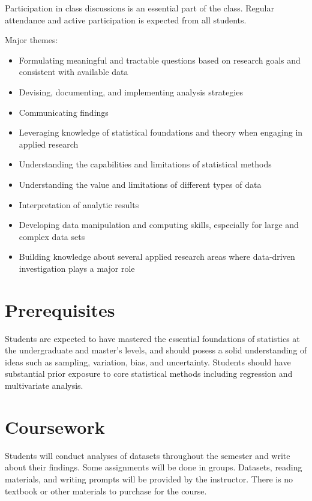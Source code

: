 \documentclass[11pt]{article}
\begin{document}
Participation in class discussions is an essential part of the class.
Regular attendance and active participation is expected from all students.

Major themes:
\begin{itemize}
	\item Formulating meaningful and tractable questions based on research goals and consistent with available data
	\item Devising, documenting, and implementing analysis strategies
	\item Communicating findings
	\item Leveraging knowledge of statistical foundations and theory when engaging in applied research
	\item Understanding the capabilities and limitations of statistical methods
	\item Understanding the value and limitations of different types of data
	\item Interpretation of analytic results
	\item Developing data manipulation and computing skills, especially for large and complex data sets
	\item Building knowledge about several applied research areas where data-driven investigation plays a major role
\end{itemize}

\section*{Prerequisites}

Students are expected to have mastered the essential foundations of statistics at the undergraduate and master’s levels, and should posess a solid understanding of ideas such as sampling, variation, bias, and uncertainty. Students should have substantial prior exposure to core statistical methods including regression and multivariate analysis.

\section*{Coursework}

Students will conduct analyses of datasets throughout the semester and write about their findings.
Some assignments will be done in groups.
Datasets, reading materials, and writing prompts will be provided by the instructor.
There is no textbook or other materials to purchase for the course.
\end{document}
